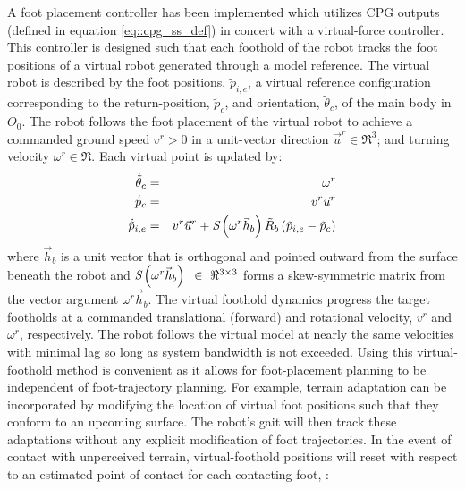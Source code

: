 		A foot placement controller has been implemented which utilizes CPG outputs (defined in equation \ref{eq::cpg_ss_def}) in concert with a virtual-force controller. This controller is designed such that each foothold of the robot tracks the foot positions of a virtual robot generated through a model reference. The virtual robot is described by the foot positions, $\tilde{p}_{i,e}$, a virtual reference configuration corresponding to the return-position, $\tilde{p}_{c}$, and orientation, $\tilde{\theta}_{c}$, of the main body in $O_{0}$. The robot follows the foot placement of the virtual robot to achieve a commanded ground speed $v^{r} > 0$ in a unit-vector direction $\vec{u}^{r} \in \Re^{3}$; and turning velocity $\omega^{r} \in \Re$. Each virtual point is updated by:
		\begin{eqnarray}
			\dot{\tilde{\theta}}_{c}	& = & \omega^{r} 				\nonumber\\
			\dot{\tilde{p}}_{c}			& = & v^{r}\vec{u}^{r}			\nonumber\\
			\dot{\tilde{p}}_{i,e} 		& = & v^{r}\vec{u}^{r} + \emph{S}\left(\omega^{r}\vec{h}_{b}\right) \tilde{R}_{b} \left(\tilde{p}_{i,e}-\tilde{p}_{c} \right) 
			\label{eq::virtual_foothold_control}
		\end{eqnarray}
		where $\vec{h}_{b}$ is a unit vector that is orthogonal and pointed outward from the surface beneath the robot and $\emph{S}\left(\omega^{r}\vec{h}_{b}\right)\text{ }\in\text{ }\Re^{3\times3}$ forms a skew-symmetric matrix from the vector argument $\omega^{r}\vec{h}_{b}$. The virtual foothold dynamics progress the target footholds at a commanded translational (forward) and rotational velocity, $v^{r}$ and $\omega^{r}$, respectively. The robot follows the virtual model at nearly the same velocities with minimal lag so long as system bandwidth is not exceeded. Using this virtual-foothold method is convenient as it allows for foot-placement planning to be independent of foot-trajectory planning. For example, terrain adaptation can be incorporated by modifying the location of virtual foot positions such that they conform to an upcoming surface. The robot's gait will then track these adaptations without any explicit modification of foot trajectories. In the event of contact with unperceived terrain, virtual-foothold positions will reset with respect to an estimated point of contact for each \Ith contacting foot, \IE:
			\begin{algorithm}[!h]
				\begin{algorithmic}
					\EndIf
				\EndFor
				\end{algorithmic}
			\end{algorithm}

